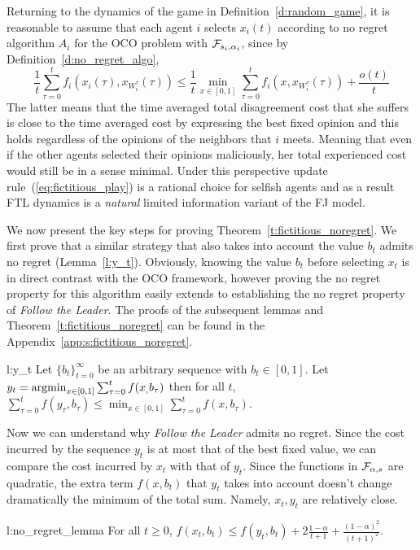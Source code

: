Returning to the dynamics of the game in Definition~\ref{d:random_game},
it is reasonable to assume that each agent $i$ selects $x_i(t)$ according
to no regret algorithm $A_i$ for the OCO problem with $\mathcal{F}_{s_i,\alpha_i}$,
since by Definition~\ref{d:no_regret_algo},
\[\frac{1}{t}\sum_{\tau=0}^t f_i(x_i(\tau),x_{W_i^\tau}(\tau)) \leq
\frac{1}{t}\min_{x \in [0,1]}\sum_{\tau=0}^tf_i(x,x_{W_i^\tau}(\tau)) + \frac{o(t)}{t}\]
The latter means that the time averaged total disagreement cost
that she suffers is close to the time averaged cost by expressing the
best fixed opinion and this holds regardless of the opinions of the
neighbors that $i$ meets. Meaning that even if the other agents
selected their opinions maliciously, her total experienced cost
would still be in a sense minimal. Under this perspective
update rule~(\ref{eq:fictitious_play}) is a rational choice for
selfish agents and as a result FTL dynamics is 
a \emph{natural} limited information variant of the FJ model.



We now present the key steps for proving Theorem~\ref{t:fictitious_noregret}.
We first prove that a similar strategy that also takes into
account the value $b_t$ admits no regret (Lemma~\ref{l:y_t}).
Obviously, knowing the value $b_t$ before selecting $x_t$
is in direct contrast with the OCO framework, however proving
the no regret property for this algorithm easily extends to
establishing the no regret property of \emph{Follow the Leader}.
The proofs of the subsequent lemmas and Theorem~\ref{t:fictitious_noregret} can
be found in the Appendix~\ref{app:s:fictitious_noregret}.
\begin{replemma}{l:y_t}
Let $\{b_t\}_{t=0}^\infty$ be an arbitrary sequence with $b_t \in [0,1]$.
Let $y_t = \operatorname*{argmin}_{x \in [0,1]}\sum_{\tau=0}^tf(x_,b_\tau)$
then for all $t$,
\(
\sum_{\tau=0}^t f(y_\tau,b_\tau) \leq \min_{x \in [0,1]}
\sum_{\tau = 0}^tf(x,b_\tau).
\)
\end{replemma}
Now we can understand why \emph{Follow the Leader}
admits no regret. Since the cost incurred by the sequence $y_t$ is at most that
of the best fixed value, we can compare the cost incurred by $x_t$ with
that of $y_t$.  Since the functions in $\mathcal{F}_{\alpha,s}$ are quadratic,
the extra term $f(x,b_t)$ that $y_t$ takes into account doesn't change
dramatically the minimum of the total sum. Namely, $x_t,y_t$
are relatively close.
\begin{replemma}{l:no_regret_lemma}
  For all $t\geq 0$,
  \(
    f(x_t,b_t) \leq f(y_t,b_t) + 2\frac{1-\alpha}{t+1} +
    \frac{(1-\alpha)^2}{(t+1)^2}
  \).
\end{replemma}
